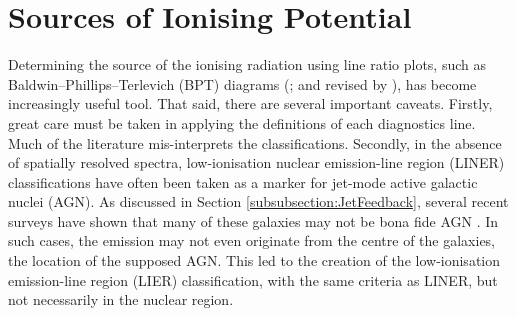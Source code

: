 \section{Sources of Ionising Potential}
	\label{sec:Diagnostics}
	Determining the source of the ionising radiation using line ratio plots, such as Baldwin--Phillips--Terlevich (BPT) diagrams (\citealt{Baldwin1981}; and revised by \citealt{Kewley2001, Kauffmann2003a}), has become increasingly useful tool. That said, there are several important caveats. Firstly, great care must be taken in applying the definitions of each diagnostics line. Much of the literature mis-interprets the classifications. Secondly, in the absence of spatially resolved spectra, low-ionisation nuclear emission-line region (LINER) classifications have often been taken as a marker for jet-mode active galactic nuclei (AGN). As discussed in Section \ref{subsubsection:JetFeedback}, several recent surveys have shown that many of these galaxies may not be bona fide AGN \citep[e.g.][]{Sarzi2005, Sarzi2010, Singh2013, Belfiore2016a}. In such cases, the emission may not even originate from the centre of the galaxies, the location of the supposed AGN. This led to the creation of the low-ionisation emission-line region (LIER) classification, with the same criteria as LINER, but not necessarily in the nuclear region.



